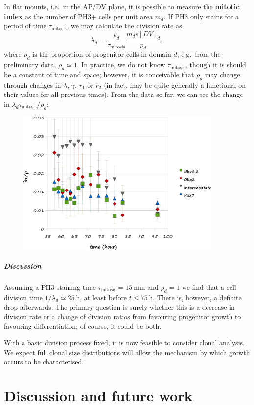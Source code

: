 \documentclass[10pt,english]{report}
\begin{document}
In flat mounts, i.e.\ in the AP/DV plane, it is possible to measure the \textbf{mitotic index} as the number of PH3+ cells per unit area $m_d$. If PH3 only stains for a period of time $\tau_\textrm{mitosis}$, we may calculate the division rate as $$\lambda_d = \frac{\rho_d}{\tau_\textrm{mitosis}}\frac{m_d s [DV]_d}{p_d},$$ where $\rho_d$ is the proportion of progenitor cells in domain $d$, e.g.\ from the preliminary data, $\rho_d \simeq 1$. In practice, we do not know $\tau_\textrm{mitosis}$, though it is should be a constant of time and space; however, it is conceivable that $\rho_d$ may change through changes in $\lambda$, $\gamma$, $r_1$ or $r_2$ (in fact, may be quite generally a functional on their values for all previous times). From the data so far, we can see the change in $\lambda_d \tau_\textrm{mitosis} / \rho_d$:

\begin{figure}[h]
	\begin{center}
		\includegraphics[width=4in]{consistency-mitotic-index.png}
	\end{center}
\end{figure}

\paragraph{Discussion}

Assuming a PH3 staining time $\tau_\textrm{mitosis} = \SI{15}{\minute}$ and $\rho_d = 1$ we find that a cell division time $1/\lambda_d \simeq \SI{25}{\hour}$, at least before $t \le \SI{75}{\hour}$. There is, however, a definite drop afterwards. The primary question is surely whether this is a decrease in division rate or a change of division ratios from favouring progenitor growth to favouring differentiation; of course, it could be both.

With a basic division process fixed, it is now feasible to consider clonal analysis. We expect full clonal size distributions will allow the mechanism by which growth occurs to be characterised.




\chapter{Discussion and future work}


\newpage
{}
\renewcommand\bibname{References}
%
\printbibliography[]
\end{document}
